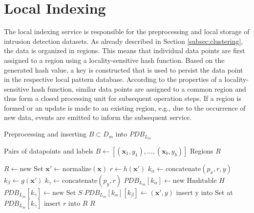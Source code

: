 \section{Local Indexing} \label{sec:local_indexing}

The local indexing service is responsible for the preprocessing and local storage of intrusion detection datasets. As already described in Section \ref{subsec:clustering}, the data is organized in regions. This means that individual data points are first assigned to a region using a locality-sensitive hash function. Based on the generated hash value, a key is constructed that is used to persist the data point in the respective local pattern database. According to the properties of a locality-sensitive hash function, similar data points are assigned to a common region and thus form a closed processing unit for subsequent operation steps. If a region is formed or an update is made to an existing region, e.g., due to the occurrence of new data, events are emitted to inform the subsequent service. 

\begin{algorithm}
    \caption{Preprocessing and inserting $B \subset D_m$ into $PDB_{L_m}$}
    \label{alg:indexing}

    \begin{algorithmic}[1]
        \REQUIRE Pairs of datapoints and labels $B \leftarrow [(\bm{x}_1, y_1), \dots, (\bm{x}_b, y_b)]$
        \ENSURE Regions $R$

        \STATE $R \leftarrow \text{new Set}$
            \STATE $\bm{x}' \leftarrow \text{normalize}(\bm{x})$ 
            \STATE $r \leftarrow h(\bm{x}')$
            \STATE $k_\alpha \leftarrow \text{concatenate}(p_x, r, y)$ \label{alg:indexing_kalpha}
            \STATE $k_\beta \leftarrow g(\bm{x}')$ \label{alg:indexing_kbeta}
            \STATE $k_\gamma \leftarrow \text{concatenate}(p_y,r)$ \label{alg:indexing_kgamma}
                \STATE $PDB_{L_m}[k_\alpha] \leftarrow \text{new Hashtable } H$
            \ENDIF
                \STATE $PDB_{L_m}[k_\gamma] \leftarrow \text{new Set } S$
            \ENDIF
            \STATE $PDB_{L_m}[k_\alpha][k_\beta] \leftarrow (\bm{x}', y)$
            \STATE insert y into Set at $PDB_{L_m}[k_\gamma]$
            \STATE $\text{insert } r \text{ into } R$
            \ENDIF         
        \ENDFOR
        \RETURN $R$
    \end{algorithmic}

\end{algorithm}

